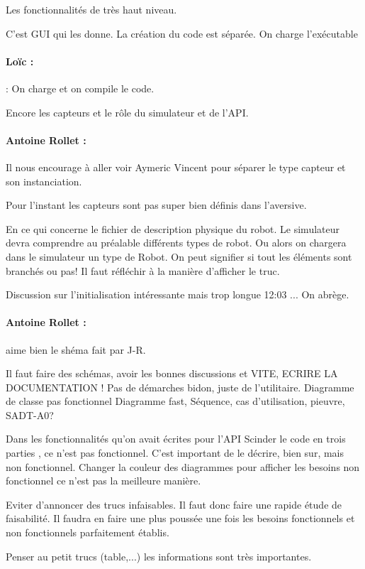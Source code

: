 \documentclass[a4paper,10pt]{article}
\begin{document}
Les fonctionnalités de très haut niveau.

C'est GUI qui les donne.
La création du code est séparée. On charge l'exécutable

\paragraph{Loïc :}:
On charge et on compile le code.

Encore les capteurs et le rôle du simulateur et de l'API.
\paragraph{Antoine Rollet :}
Il nous encourage à aller voir Aymeric Vincent pour séparer le type capteur et son instanciation.

Pour l'instant les capteurs sont pas super bien définis dans l'aversive.

En ce qui concerne le fichier de description physique du robot. 
Le simulateur devra comprendre au préalable différents types de robot. 
Ou alors on chargera dans le simulateur un type de Robot.
On peut signifier si tout les éléments sont branchés ou pas!
Il faut réfléchir à la manière d'afficher le truc.

Discussion sur l'initialisation intéressante  mais trop longue 12:03 ...
On abrège.

\paragraph{Antoine Rollet :} aime bien le shéma fait par J-R.

Il faut faire des schémas, avoir les bonnes discussions et VITE, ECRIRE LA DOCUMENTATION !
Pas de démarches bidon, juste de l'utilitaire.
Diagramme de classe pas fonctionnel
Diagramme fast, Séquence, cas d'utilisation, pieuvre, SADT-A0?

Dans les fonctionnalités qu'on avait écrites pour l'API \og Scinder le code en trois parties \fg, ce n'est pas fonctionnel. C'est important de le décrire, bien sur, mais non fonctionnel.
Changer la couleur des diagrammes pour afficher les besoins non fonctionnel ce n'est pas la meilleure manière.

Eviter d'annoncer des trucs infaisables. Il faut donc faire une rapide étude de faisabilité. Il faudra en faire une plus poussée une fois les besoins fonctionnels et non fonctionnels parfaitement établis.

Penser au petit trucs (table,...) les informations sont très importantes.
\end{document}
